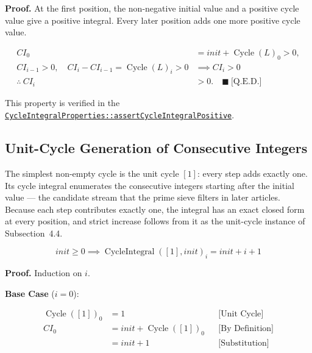 \textbf{Proof.} At the first position, the non-negative initial value and a
positive cycle value give a positive integral. Every later position adds one
more positive cycle value.

\begin{equation*}
\begin{aligned}
CI_0 &= init+\operatorname{Cycle}(L)_0>0, \\
CI_{i-1}>0,\quad CI_i-CI_{i-1}=\operatorname{Cycle}(L)_i>0
  &\implies CI_i>0 \\
\therefore\ CI_i &> 0.
  \quad \blacksquare\ \text{[Q.E.D.]}
\end{aligned}
\end{equation*}

{\raggedright
This property is verified in the
\href{https://github.com/thiagomata/prime-numbers/blob/integral-cycle-article-v1.0.0/src/main/scala/v1/chapter4/cycle/integral/recursive/properties/CycleIntegralProperties.scala}{\texttt{CycleIntegralProperties::\allowbreak assertCycleIntegralPositive}}.
\par}

\subsection{Unit-Cycle Generation of Consecutive Integers}

The simplest non-empty cycle is the unit cycle $[1]$: every step adds exactly
one. Its cycle integral enumerates the consecutive integers starting after
the initial value --- the candidate stream that the prime sieve filters in
later articles. Because each step contributes exactly one, the integral has
an exact closed form at every position, and strict increase follows from it
as the unit-cycle instance of Subsection~4.4.

\begin{equation*}
init \geq 0 \implies \operatorname{CycleIntegral}([1], init)_i = init + i + 1
\end{equation*}

\textbf{Proof.} Induction on $i$.

\textbf{Base Case} ($i = 0$):

\begin{equation*}
\begin{aligned}
\operatorname{Cycle}([1])_0 &= 1 && \text{[Unit Cycle]} \\
CI_0 &= init + \operatorname{Cycle}([1])_0 && \text{[By Definition]} \\
&= init + 1 && \text{[Substitution]}
\end{aligned}
\end{equation*}

